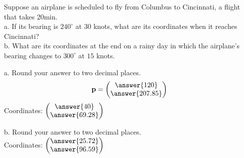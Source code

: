 \documentclass{ximera}
\author{Parisa Fatheddin}
\begin{document}
\begin{exercise}


Suppose an airplane is scheduled to fly from Columbus to Cincinnati, a flight that takes 20min. \\
a. If its bearing is $240^{\circ}$ at $30$ knots, what are its coordinates when it reaches Cincinnati?\\
b. What are its coordinates at the end on a rainy day in which the airplane's bearing changes to $300^{\circ}$ at $15$ knots.



\begin{prompt}
a. Round your answer to two decimal places.
\[\vec{p} = \begin{pmatrix} \answer{120} \\
\answer{207.85}\end{pmatrix}
\]
Coordinates: $\begin{pmatrix} \answer{40} \\
\answer{69.28}\end{pmatrix}$

b. Round your answer to two decimal places. \\

Coordinates: $ \begin{pmatrix} \answer{25.72}\\
\answer{96.59}
\end{pmatrix}$
\end{prompt}




















\end{exercise}
\end{document}
